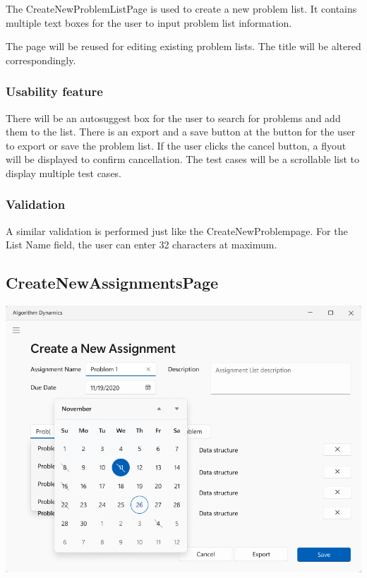 \documentclass[a4paper]{report}
\begin{document}
The CreateNewProblemListPage is used to create a new problem list. It contains multiple text boxes for the user to input problem list information.

The page will be reused for editing existing problem lists. The title will be altered correspondingly.

\subsubsection{Usability feature}

There will be an autosuggest box for the user to search for problems and add them to the list. There is an export and a save button at the button for the user to export or save the problem list. If the user clicks the cancel button, a flyout will be displayed to confirm cancellation. The test cases will be a scrollable list to display multiple test cases.

\subsubsection{Validation}

A similar validation is performed just like the CreateNewProblempage. For the List Name field, the user can enter 32 characters at maximum.

\subsection{CreateNewAssignmentsPage}
\label{sec:CreateNewAssignmentsPageDesign}

\includegraphics[width=\textwidth, height=\textheight, keepaspectratio]{CreateNewAssignmentsPage-design}
\end{document}
